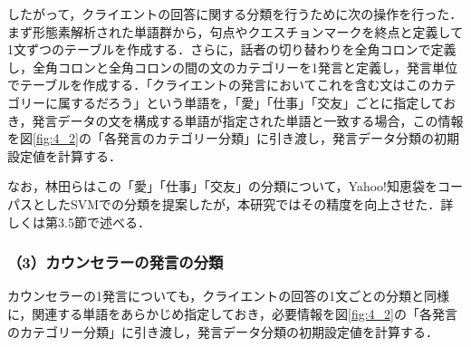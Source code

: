 \documentclass[shuuron]{kuee}
\begin{document}


したがって，クライエントの回答に関する分類を行うために次の操作を行った．まず形態素解析された単語群から，句点やクエスチョンマークを終点と定義して1文ずつのテーブルを作成する．さらに，話者の切り替わりを全角コロンで定義し，全角コロンと全角コロンの間の文のカテゴリーを1発言と定義し，発言単位でテーブルを作成する．「クライエントの発言においてこれを含む文はこのカテゴリーに属するだろう」という単語を，「愛」「仕事」「交友」ごとに指定しておき，発言データの文を構成する単語が指定された単語と一致する場合，この情報を図\ref{fig:4_2}の「各発言のカテゴリー分類」に引き渡し，発言データ分類の初期設定値を計算する．

なお，林田ら\cite{hayashidaEn}はこの「愛」「仕事」「交友」の分類について，Yahoo!知恵袋をコーパスとしたSVMでの分類を提案したが，本研究ではその精度を向上させた．詳しくは第3.5節で述べる．


\subsubsection{（3）カウンセラーの発言の分類}






カウンセラーの1発言についても，クライエントの回答の1文ごとの分類と同様に，関連する単語をあらかじめ指定しておき，必要情報を図\ref{fig:4_2}の「各発言のカテゴリー分類」に引き渡し，発言データ分類の初期設定値を計算する．
\end{document}
